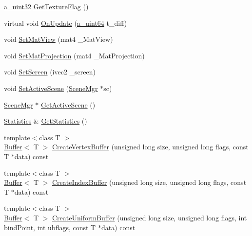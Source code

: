 \begin{DoxyCompactItemize}
\item 
\hyperlink{_common_defines_8h_a964296f9770051b9e4807b1f180dd416}{a\+\_\+uint32} \hyperlink{class_agmd_1_1_driver_a3157d0c87887c8ccd55e6be13942afe0}{Get\+Texture\+Flag} ()
\item 
virtual void \hyperlink{class_agmd_1_1_driver_a1575876d9c54b9ed8e841f7a31049427}{On\+Update} (\hyperlink{_common_defines_8h_a6c5192ec3c55d6e5b13d2dbaa082bdea}{a\+\_\+uint64} t\+\_\+diff)
\item 
void \hyperlink{class_agmd_1_1_driver_a382852489bb3aa834d0e65059a2b4d70}{Set\+Mat\+View} (mat4 \+\_\+\+Mat\+View)
\item 
void \hyperlink{class_agmd_1_1_driver_af3d4d9d04dac8478f67b27f1a2894204}{Set\+Mat\+Projection} (mat4 \+\_\+\+Mat\+Projection)
\item 
void \hyperlink{class_agmd_1_1_driver_a34d0dfd09cfe090268806c7dd5a8b0e0}{Set\+Screen} (ivec2 \+\_\+screen)
\item 
void \hyperlink{class_agmd_1_1_driver_ae7bb6fde1c016329ed9b61d61ffc5e06}{Set\+Active\+Scene} (\hyperlink{class_agmd_1_1_scene_mgr}{Scene\+Mgr} $\ast$sc)
\item 
\hyperlink{class_agmd_1_1_scene_mgr}{Scene\+Mgr} $\ast$ \hyperlink{class_agmd_1_1_driver_ae2f53381d96063c7dab24d62637df6ec}{Get\+Active\+Scene} ()
\item 
\hyperlink{class_agmd_1_1_statistics}{Statistics} \& \hyperlink{class_agmd_1_1_driver_a173f21b78beddc1227b2a8aec81f2631}{Get\+Statistics} ()
\item 
{\footnotesize template$<$class T $>$ }\\\hyperlink{class_agmd_1_1_buffer}{Buffer}$<$ T $>$ \hyperlink{class_agmd_1_1_driver_a2f28ead26c46cf0d4d44176f7d61ab70}{Create\+Vertex\+Buffer} (unsigned long size, unsigned long flags, const T $\ast$data) const 
\item 
{\footnotesize template$<$class T $>$ }\\\hyperlink{class_agmd_1_1_buffer}{Buffer}$<$ T $>$ \hyperlink{class_agmd_1_1_driver_a487edfdc09992541069350015f8469f4}{Create\+Index\+Buffer} (unsigned long size, unsigned long flags, const T $\ast$data) const 
\item 
{\footnotesize template$<$class T $>$ }\\\hyperlink{class_agmd_1_1_buffer}{Buffer}$<$ T $>$ \hyperlink{class_agmd_1_1_driver_a578e8bcd7fadd7ca91f9458a3ffbc5b2}{Create\+Uniform\+Buffer} (unsigned long size, unsigned long flags, int bind\+Point, int ubflags, const T $\ast$data) const 
\item 

\end{DoxyCompactItemize}
